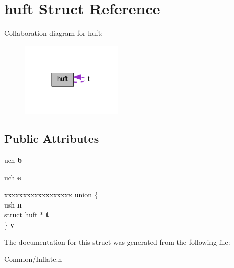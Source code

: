 \hypertarget{structhuft}{}\section{huft Struct Reference}
\label{structhuft}


Collaboration diagram for huft\+:
\nopagebreak
\begin{figure}[H]
\begin{center}
\leavevmode
\includegraphics[width=137pt]{structhuft__coll__graph}
\end{center}
\end{figure}
\subsection*{Public Attributes}
\begin{DoxyCompactItemize}
\item 
\mbox{\label{structhuft_a65c6f989d48d53e5d6d8216623b595e4}} 
uch {\bfseries b}
\item 
\mbox{\label{structhuft_a1d697b6254483448b765d053ed64cd50}} 
uch {\bfseries e}
\item 
\mbox{\label{structhuft_af6a875a107b094f0a0dd17c04e6fb607}} 
\begin{tabbing}
xx\=xx\=xx\=xx\=xx\=xx\=xx\=xx\=xx\=\kill
union \{\\
\>ush {\bfseries n}\\
\>struct \hyperlink{structhuft}{huft} $\ast$ {\bfseries t}\\
\} {\bfseries v}\\

\end{tabbing}\end{DoxyCompactItemize}


The documentation for this struct was generated from the following file\+:\begin{DoxyCompactItemize}
\item 
Common/Inflate.\+h\end{DoxyCompactItemize}
